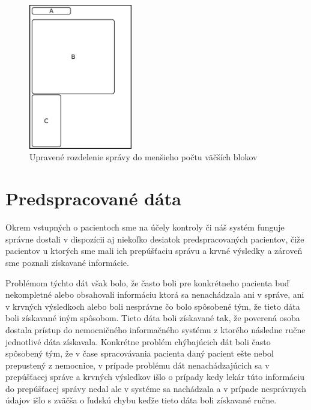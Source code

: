 \begin{figure}
	\centerline{\includegraphics[width=0.4\textwidth]{images/vyzor_spravy_vylepsena}}
	\caption[Upravené rozloženie správy]{Upravené rozdelenie správy do menšieho počtu väčších blokov}
	\label{obr:sprava_uprava}
\end{figure}
   
\section{Predspracované dáta}
\label{predSprac}
Okrem vstupných o pacientoch sme na účely kontroly či náš systém funguje správne dostali v dispozícii aj niekoľko desiatok predspracovaných pacientov, čiže pacientov u ktorých sme mali ich prepúšťaciu správu a krvné výsledky a zároveň sme poznali získavané informácie. 

Problémom týchto dát však bolo, že často boli pre konkrétneho pacienta buď nekompletné alebo obsahovali informáciu ktorá sa nenachádzala ani v správe, ani v krvných výsledkoch alebo boli nesprávne čo bolo spôsobené tým, že tieto dáta boli získavané iným spôsobom. Tieto dáta boli získavané tak, že poverená osoba dostala prístup do nemocničného informačného systému z ktorého následne ručne jednotlivé dáta získavala. Konkrétne problém chýbajúcich dát boli často spôsobený tým, že v čase spracovávania pacienta daný pacient ešte nebol prepustený z nemocnice, v prípade problému dát nenachádzajúcich sa v prepúšťacej správe a krvných výsledkov išlo o prípady kedy lekár túto informáciu do prepúšťacej správy nedal ale v systéme sa nachádzala a v prípade nesprávnych údajov išlo s zväčša o ľudskú chybu keďže tieto dáta boli získavané ručne.

